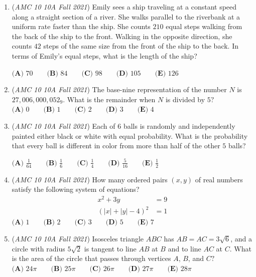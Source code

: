 \begin{enumerate}
 $\textbf{(A)}\ {-}18.5  \qquad\textbf{(B)}\ {-}13.5 \qquad\textbf{(C)}\ 0 \qquad\textbf{(D)}\ 13.5 \qquad\textbf{(E)}\ 18.5$


	\item (\textit{AMC 10 10A Fall 2021}) Emily sees a ship traveling at a constant speed along a straight section of a river. She walks parallel to the riverbank at a uniform rate faster than the ship. She counts $210$ equal steps walking from the back of the ship to the front. Walking in the opposite direction, she counts $42$ steps of the same size from the front of the ship to the back. In terms of Emily's equal steps, what is the length of the ship?


 $\textbf{(A) }70\qquad\textbf{(B) }84\qquad\textbf{(C) }98\qquad\textbf{(D) }105\qquad\textbf{(E) }126$


	\item (\textit{AMC 10 10A Fall 2021}) The base-nine representation of the number $N$ is $27{,}006{,}000{,}052_{\text{9}}.$ What is the remainder when $N$ is divided by $5?$
$\textbf{(A) } 0\qquad\textbf{(B) } 1\qquad\textbf{(C) } 2\qquad\textbf{(D) } 3\qquad\textbf{(E) }4$


	\item (\textit{AMC 10 10A Fall 2021}) Each of $6$ balls is randomly and independently painted either black or white with equal probability. What is the probability that every ball is different in color from more than half of the other $5$ balls?


 $\textbf{(A) } \frac{1}{64}\qquad\textbf{(B) } \frac{1}{6}\qquad\textbf{(C) } \frac{1}{4}\qquad\textbf{(D) } \frac{5}{16}\qquad\textbf{(E) }\frac{1}{2}$


	\item (\textit{AMC 10 10A Fall 2021}) How many ordered pairs $(x,y)$ of real numbers satisfy the following system of equations? 
\begin{align}
x^2+3y&=9 \\
(|x|+|y|-4)^2 &= 1
\end{align}
$\textbf{(A) } 1 \qquad\textbf{(B) } 2 \qquad\textbf{(C) } 3 \qquad\textbf{(D) } 5 \qquad\textbf{(E) } 7$


	\item (\textit{AMC 10 10A Fall 2021}) Isosceles triangle $ABC$ has $AB = AC = 3\sqrt6$, and a circle with radius $5\sqrt2$ is tangent to line $AB$ at $B$ and to line $AC$ at $C$. What is the area of the circle that passes through vertices $A$, $B$, and $C?$
$\textbf{(A) }24\pi\qquad\textbf{(B) }25\pi\qquad\textbf{(C) }26\pi\qquad\textbf{(D) }27\pi\qquad\textbf{(E) }28\pi$



\end{enumerate}
